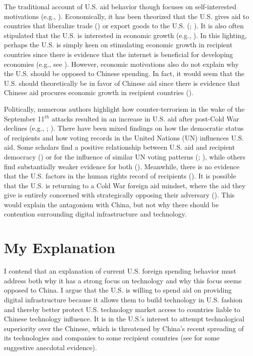 \documentclass[12pt]{article}
\begin{document}
The traditional account of U.S. aid behavior though focuses on self-interested motivations (e.g., \cite{mckinlay1977}). Economically, it has been theorized that the U.S. gives aid to countries that liberalize trade (\cite{alesina2000}) or export goods to the U.S. (\cite{younas2008}; \cite{fuchs2014}). It is also often stipulated that the U.S. is interested in economic growth (e.g., \cite{bearce2010b}). In this lighting, perhaps the U.S. is simply keen on stimulating economic growth in recipient countries since there is evidence that the internet is beneficial for developing economies (e.g., see \cite{wallsten2005}). However, economic motivations also do not explain why the U.S. should be opposed to Chinese spending. In fact, it would seem that the U.S. should theoretically be in favor of Chinese aid since there is evidence that Chinese aid procures economic growth in recipient countries (\cite{dreher2021}).

Politically, numerous authors highlight how counter-terrorism in the wake of the September 11$^{th}$ attacks resulted in an increase in U.S. aid after post-Cold War declines (e.g., \cite{fleck2010}; \cite{bearce2010b}). There have been mixed findings on how the democratic status of recipients and how voting records in the United Nations (UN) influences U.S. aid. Some scholars find a positive relationship between U.S. aid and recipient democracy (\cite{alesina2000}) or for the influence of similar UN voting patterns (\cite{alesina2000}; \cite{fuchs2014}), while others find substantially weaker evidence for both (\cite{hoeffler2011}). Meanwhile, there is no evidence that the U.S. factors in the human rights record of recipients (\cite{hoeffler2011}). It is possible that the U.S. is returning to a Cold War foreign aid mindset, where the aid they give is entirely concerned with strategically opposing their adversary (\cite{bearce2010b}). This would explain the antagonism with China, but not why there should be contention surrounding digital infrastructure and technology. %

\section*{My Explanation}
I contend that an explanation of current U.S. foreign spending behavior must address both why it has a strong focus on technology and why this focus seems opposed to China. I argue that the U.S. is willing to spend aid on providing digital infrastructure because it allows them to build technology in U.S. fashion and thereby better protect U.S. technology market access to countries liable to Chinese technology influence. It is in the U.S.'s interest to attempt technological superiority over the Chinese, which is threatened by China's recent spreading of its technologies and companies to some recipient countries (see \cite{hass2021} for some suggestive anecdotal evidence).
\end{document}
